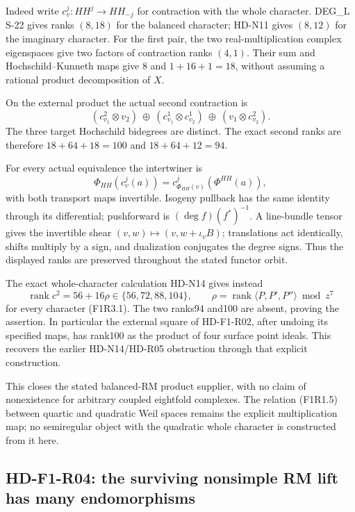 Indeed write $c_v^j:HH^j\to HH_{-j}$ for contraction with the
whole character. DEG\_L S-22 gives ranks $(8,18)$ for the balanced
character; HD-N11 gives $(8,12)$ for the imaginary character.
For the first pair, the two real-multiplication complex eigenspaces
give two factors of contraction ranks $(4,1)$. Their sum and
Hochschild--Kunneth maps give $8$ and $1+16+1=18$, without
assuming a rational product decomposition of $X$.

On the external product the actual second contraction is
\[
 (c_{v_1}^2\otimes v_2)\ \oplus\
 (c_{v_1}^1\otimes c_{v_2}^1)\ \oplus\
 (v_1\otimes c_{v_2}^2).
 \tag{F1R3.2}
\]
The three target Hochschild bidegrees are distinct. The exact
second ranks are therefore $18+64+18=100$ and $18+64+12=94$.

For every actual equivalence the intertwiner is
\[
 \Phi_{HH}(c_v^j(a))
      =c_{\Phi_{HH}(v)}^j(\Phi^{HH}(a)),
 \tag{F1R3.3}
\]
with both transport maps invertible. Isogeny pullback has the
same identity through its differential; pushforward is
$(\deg f)(f^*)^{-1}$. A line-bundle tensor gives the invertible
shear $(v,w)\mapsto(v,w+\iota_vB)$; translations act identically,
shifts multiply by a sign, and dualization conjugates the degree
signs. Thus the displayed ranks are preserved throughout the
stated functor orbit.

The exact whole-character calculation HD-N14 gives instead
\[
 \operatorname{rank}c^2=56+16\rho\in\{56,72,88,104\},
 \qquad\rho=\operatorname{rank}\langle P,P',P''\rangle\bmod z^7
 \tag{F1R3.4}
\]
for every character (F1R3.1). The two ranks94 and100 are absent,
proving the assertion. In particular the external square of
HD-F1-R02, after undoing its specified maps, has rank100 as the
product of four surface point ideals. This recovers the earlier
HD-N14/HD-R05 obstruction through that explicit construction.

This closes the stated balanced-RM product supplier, with no
claim of nonexistence for arbitrary coupled eightfold complexes.
The relation (F1R1.5) between quartic and quadratic Weil spaces
remains the explicit multiplication map; no semiregular object
with the quadratic whole character is constructed from it here.

\subsection{HD-F1-R04: the surviving nonsimple RM lift has many endomorphisms}

